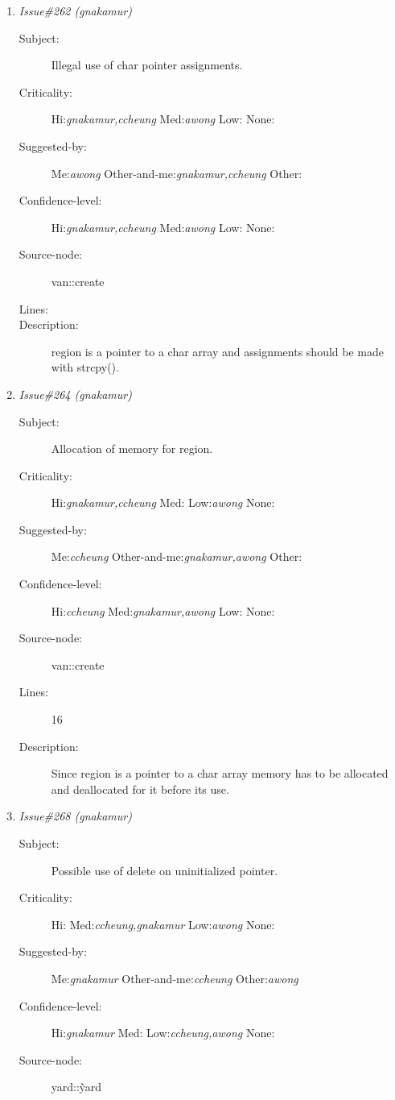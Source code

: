 \begin{enumerate}
\begin{description}
\item [Lines:] 11

\item [Description:] regionString is not initialized leading to
unpredictable results.
\end{description}
\item {\it Issue\#262 (gnakamur)}
\begin{description}
\item [Subject:] Illegal use of char pointer assignments.
\item [Criticality:] Hi:{\it gnakamur,ccheung} Med:{\it awong} Low:{\it } None:{\it }
\item [Suggested-by:] Me:{\it awong} Other-and-me:{\it gnakamur,ccheung} Other:{\it }
\item [Confidence-level:] Hi:{\it gnakamur,ccheung} Med:{\it awong} Low:{\it } None:{\it }
\item [Source-node:] van::create

\item [Lines:] 

\item [Description:] region is a pointer to a char array and
assignments should be made with strcpy().
\end{description}
\item {\it Issue\#264 (gnakamur)}
\begin{description}
\item [Subject:] Allocation of memory for region.
\item [Criticality:] Hi:{\it gnakamur,ccheung} Med:{\it } Low:{\it awong} None:{\it }
\item [Suggested-by:] Me:{\it ccheung} Other-and-me:{\it gnakamur,awong} Other:{\it }
\item [Confidence-level:] Hi:{\it ccheung} Med:{\it gnakamur,awong} Low:{\it } None:{\it }
\item [Source-node:] van::create

\item [Lines:] 16

\item [Description:] Since region is a pointer to a char array
memory has to be allocated and deallocated for it before its use.
\end{description}
\item {\it Issue\#268 (gnakamur)}
\begin{description}
\item [Subject:] Possible use of delete on uninitialized pointer.
\item [Criticality:] Hi:{\it } Med:{\it ccheung,gnakamur} Low:{\it awong} None:{\it }
\item [Suggested-by:] Me:{\it gnakamur} Other-and-me:{\it ccheung} Other:{\it awong}
\item [Confidence-level:] Hi:{\it gnakamur} Med:{\it } Low:{\it ccheung,awong} None:{\it }
\item [Source-node:] yard::\~yard


\end{description}
\end{enumerate}
